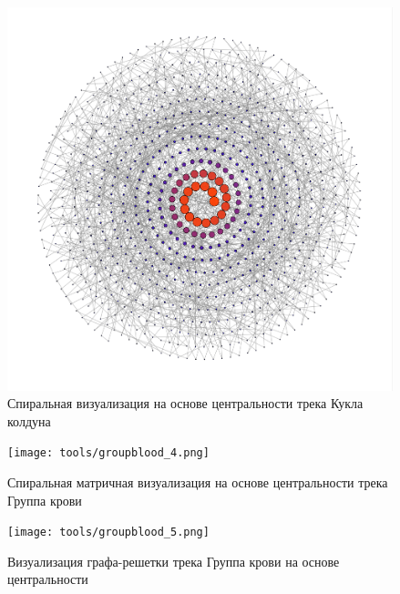 \documentclass{article}
\begin{document}
\begin{figure}[h]
	\centering
	\includegraphics[scale=0.6]{tools/king_3.png}
	\caption{Спиральная визуализация на основе центральности трека Кукла колдуна}
\end{figure}

\begin{figure}[h]
	\centering
	\texttt{[image: tools/groupblood\_4.png]}
	\caption{Спиральная матричная визуализация на основе центральности трека Группа крови}
\end{figure}

\begin{figure}[h]
	\centering
	\texttt{[image: tools/groupblood\_5.png]}
	\caption{Визуализация графа-решетки трека Группа крови на основе центральности}
\end{figure}
\end{document}
